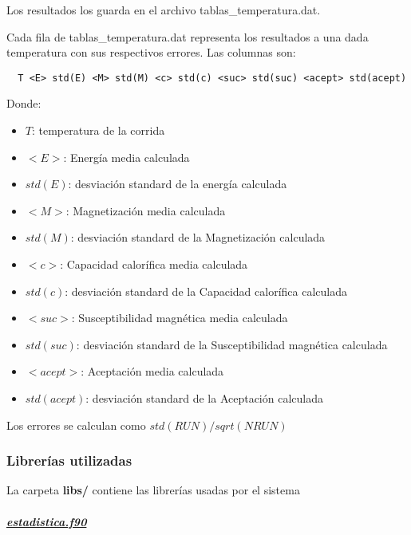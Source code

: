 Los resultados los guarda en el archivo tablas\_temperatura.dat.

Cada fila de tablas\_temperatura.dat representa los resultados a una dada
temperatura con sus respectivos errores. Las columnas son:

\begin{verbatim}
  T <E> std(E) <M> std(M) <c> std(c) <suc> std(suc) <acept> std(acept)
\end{verbatim}

Donde:



\begin{itemize}
  \item $T$: temperatura de la corrida 
    \item $<E>$: Energ\'ia media calculada
    \item  $std(E)$: desviaci\'on standard de la energ\'ia calculada

    \item $<M>$: Magnetizaci\'on media calculada
    \item  $std(M)$: desviaci\'on standard de la Magnetizaci\'on calculada


    \item $<c>$: Capacidad calor\'ifica media calculada
    \item  $std(c)$: desviaci\'on standard de la Capacidad calor\'ifica calculada

    \item $<suc>$: Susceptibilidad magn\'etica media calculada
    \item  $std(suc)$: desviaci\'on standard de la Susceptibilidad magn\'etica calculada


    \item $<acept>$: Aceptaci\'on media calculada
    \item  $std(acept)$: desviaci\'on standard de la Aceptaci\'on calculada
\end{itemize}



  Los errores se calculan como $std(RUN)/sqrt(NRUN)$


\subsubsection{Librer\'ias utilizadas}

La carpeta \textbf{libs/} contiene las librer\'ias usadas por el sistema

\paragraph{\underline{\textit{estadistica.f90}}}

